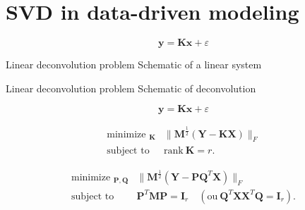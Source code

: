 \documentclass[aspectratio=169]{beamer}
\DeclareMathOperator*{\minimize}{minimize~}
\DeclareMathOperator*{\subto}{subject~to~}
\begin{document}
\section{SVD in data-driven modeling}
\begin{frame}
  \sectionpage
\end{frame}

\begin{frame}
  \vfill

  \Large

  \[
  \bm{y} = \bm{Kx} + \varepsilon
  \]

  \vfill
\end{frame}

\begin{frame}{Linear deconvolution problem}
  Schematic of a linear system
\end{frame}

\begin{frame}{Linear deconvolution problem}
  Schematic of deconvolution
\end{frame}

\begin{frame}
  \vfill

  \Large

  \[
  \bm{y} = \bm{Kx} + \varepsilon
  \]

  \vfill
\end{frame}

\begin{frame}

\end{frame}

\begin{frame}

  \vfill

  \begin{tcolorbox}[
      enhanced,
      coltitle=black,
      coltext=white,
      colback=black,
      title=\textbf{Fundamental problem of component analysis},
      frame style tile={width=\paperwidth}{background.jpg}
    ]

    \begin{overprint}
      \large
      \[
      \begin{aligned}
        \minimize_{\bm{K}} & \| \bm{M}^{\frac12} \left( \bm{Y} - \bm{KX} \right) \|_F \\
        \subto & \mathrm{rank~} \bm{K} = r.
      \end{aligned}
      \]

      \large
      \[
      \begin{aligned}
        \minimize_{\bm{P}, \bm{Q}} & \| \bm{M}^{\frac12}  \left( \bm{Y} - \bm{PQ}^T \bm{X} \right) \|_F \\
        \subto & \bm{P}^T \bm{MP} = \bm{I}_r \quad \left( \mathrm{ou~} \bm{Q}^T \bm{XX}^T \bm{Q} = \bm{I}_r \right).
      \end{aligned}
      \]

    \end{overprint}

  \end{tcolorbox}

  \vfill
\end{frame}
\end{document}
